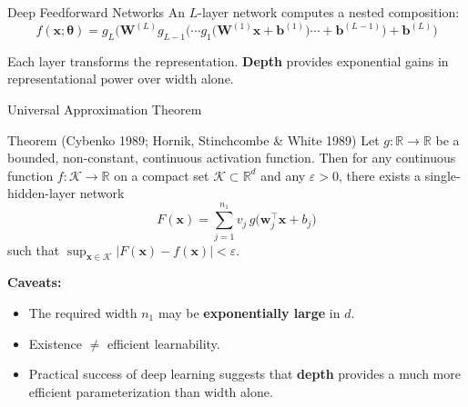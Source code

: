 \documentclass[aspectratio=169,11pt]{beamer}
\newcommand{\x}{\bm{x}}
\newcommand{\w}{\bm{w}}
\newcommand{\bb}{\bm{b}}
\newcommand{\W}{\bm{W}}
\newcommand{\R}{\mathbb{R}}
\begin{document}
\begin{frame}{Deep Feedforward Networks}
\vspace{0.1cm}
An $L$-layer network computes a nested composition:
\[
    \boxed{f(\x;\bm{\theta}) = g_L\!\Big(\W^{(L)} g_{L-1}\!\big(\cdots g_1\!\big(\W^{(1)}\x + \bb^{(1)}\big)\cdots + \bb^{(L-1)}\big) + \bb^{(L)}\Big)}
\]

{\small Each layer transforms the representation.  \textbf{Depth} provides exponential gains in representational power over width alone.}
\end{frame}

\begin{frame}{Universal Approximation Theorem}
\small
\begin{block}{Theorem (Cybenko 1989; Hornik, Stinchcombe \& White 1989)}
Let $g:\R\to\R$ be a bounded, non-constant, continuous activation function.  Then for any continuous function $f:\mathcal{K}\to\R$ on a compact set $\mathcal{K}\subset\R^d$ and any $\varepsilon>0$, there exists a single-hidden-layer network
\[
    F(\x) = \sum_{j=1}^{n_1} v_j\, g\!\big(\w_j^\top\x + b_j\big)
\]
such that $\sup_{\x\in\mathcal{K}} |F(\x) - f(\x)| < \varepsilon$.
\end{block}

\vspace{0.25cm}
\textbf{Caveats:}
\begin{itemize}\itemsep0pt
    \item The required width $n_1$ may be \textbf{exponentially large} in $d$.
    \item Existence $\neq$ efficient learnability.
    \item Practical success of deep learning suggests that \textbf{depth} provides a much more efficient parameterization than width alone.
\end{itemize}
\end{frame}
\end{document}

